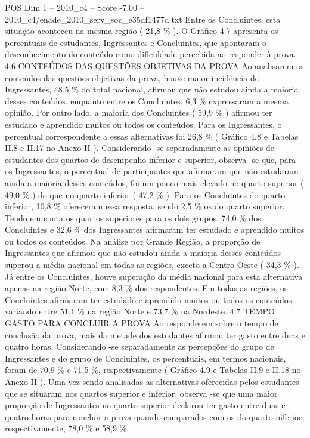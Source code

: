 \begin{textsample}{POS Dim 1 – 2010\_c4 – Score -7.00 – 2010\_c4/enade\_2010\_serv\_soc\_e35df1477d.txt}
Entre os Concluintes, esta situação aconteceu na mesma região ( 21,8 \% ).
O Gráfico 4.7 apresenta os percentuais de estudantes, Ingressantes e Concluintes, que apontaram o desconhecimento do conteúdo como dificuldade percebida ao responder à prova. 4.6 CONTEÚDOS DAS QUESTÕES OBJETIVAS DA PROVA Ao analisarem os conteúdos das questões objetivas da prova, houve maior incidência de Ingressantes, 48,5 \% do total nacional, afirmou que não estudou ainda a maioria desses conteúdos, enquanto entre os Concluintes, 6,3 \% expressaram a mesma opinião.
Por outro lado, a maioria dos Concluintes ( 59,9 \% ) afirmou ter estudado e aprendido muitos ou todos os conteúdos.
Para os Ingressantes, o percentual correspondente a essas alternativas foi 26,8 \% ( Gráfico 4.8 e Tabelas II.8 e II.17 no Anexo II ).
Considerando -se separadamente as opiniões de estudantes dos quartos de desempenho inferior e superior, observa -se que, para os Ingressantes, o percentual de participantes que afirmaram que não estudaram ainda a maioria desses conteúdos, foi um pouco mais elevado no quarto superior ( 49,0 \% ) do que no quarto inferior ( 47,2 \% ).
Para os Concluintes do quarto inferior, 10,8 \% ofereceram essa resposta, sendo 2,5 \% os do quarto superior.
Tendo em conta os quartos superiores para os dois grupos, 74,0 \% dos Concluintes e 32,6 \% dos Ingressantes afirmaram ter estudado e aprendido muitos ou todos os conteúdos.
Na análise por Grande Região, a proporção de Ingressantes que afirmou que não estudou ainda a maioria desses conteúdos superou a média nacional em todas as regiões, exceto a Centro-Oeste ( 34,3 \% ).
Já entre os Concluintes, houve superação da média nacional para esta alternativa apenas na região Norte, com 8,3 \% dos respondentes.
Em todas as regiões, os Concluintes afirmaram ter estudado e aprendido muitos ou todos os conteúdos, variando entre 51,1 \% na região Norte e 73,7 \% na Nordeste. 4.7 TEMPO GASTO PARA CONCLUIR A PROVA Ao responderem sobre o tempo de conclusão da prova, mais da metade dos estudantes afirmou ter gasto entre duas e quatro horas.
Considerando -se separadamente as percepções do grupo de Ingressantes e do grupo de Concluintes, os percentuais, em termos nacionais, foram de 70,9 \% e 71,5 \%, respectivamente ( Gráfico 4.9 e Tabelas II.9 e II.18 no Anexo II ).
Uma vez sendo analisadas as alternativas oferecidas pelos estudantes que se situaram nos quartos superior e inferior, observa -se que uma maior proporção de Ingressantes no quarto superior declarou ter gasto entre duas e quatro horas para concluir a prova quando comparados com os do quarto inferior, respectivamente, 78,0 \% e 58,9 \%.

\end{textsample}
